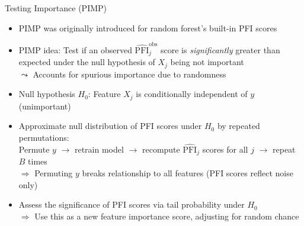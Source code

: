 \documentclass[11pt,compress,t,notes=noshow, aspectratio=169, xcolor=table]{beamer}
\begin{document}
\begin{frame}{Testing Importance (PIMP) }

\begin{itemize}[<+->]
  \item PIMP was originally introduced for random forest's built-in PFI scores
  \item PIMP idea: Test if an observed $\widehat{\text{PFI}}_j^{\text{obs}}$ score is \emph{significantly} greater than expected under the null hypothesis of $X_j$ being not important\\
  $\leadsto$ Accounts for spurious importance due to randomness
 \item Null hypothesis $H_0$: Feature $X_j$ is conditionally independent of $y$ (unimportant)
  \item Approximate null distribution of PFI scores under $H_0$ by repeated permutations:\\
  Permute $y$ $\rightarrow$ retrain model $\rightarrow$ recompute $\widehat{\text{PFI}}_j$ scores for all $j$ $\rightarrow$ repeat $B$ times\\
  $\Rightarrow$ Permuting $y$ breaks relationship to all features (PFI scores reflect noise only)%
  \item %
  Assess the significance of PFI scores via tail probability under $H_0$\\
    $\Rightarrow$ Use this as a new feature importance score, adjusting for random chance
\end{itemize}


\end{frame}
\end{document}

